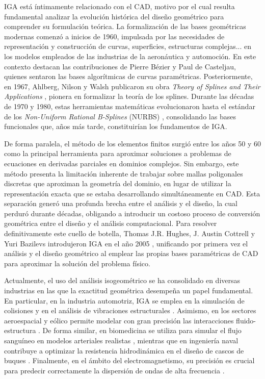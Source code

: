 \documentclass[11pt]{book}
\theoremstyle{plain} %
\theoremstyle{definition} %
\theoremstyle{definition} %
\begin{document}
IGA está íntimamente relacionado con el CAD, motivo por el cual resulta fundamental analizar la evolución histórica del diseño geométrico para comprender su formulación teórica.
La formalización de las bases geométricas modernas comenzó a inicios de 1960, impulsada por las necesidades de representación y construcción de curvas, superficies, estructuras complejas... en los modelos empleados de las industrias
de la aeronáutica y automoción. En este contexto destacan las contribuciones de Pierre Bézier y 
Paul de Casteljau, quienes sentaron las bases algorítmicas de curvas paramétricas. 
Posteriormente, en 1967, Ahlberg, Nilson y Walsh publicaron su obra 
\textit{Theory of Splines and Their Applications} \cite{ahlberg_theory_2016},
pionera en formalizar la teoría de los splines. 
Durante las décadas de 1970 y 1980, estas herramientas matemáticas evolucionaron hasta el estándar de los \textit{Non-Uniform Rational B-Splines} (NURBS) \cite{piegl_nurbs_2012}, 
consolidando las bases funcionales que, años más tarde, constituirían los fundamentos de IGA.

De forma paralela, el método de los elementos finitos surgió entre los años 50 y 60 como la principal herramienta para aproximar soluciones a problemas de ecuaciones en derivadas
parciales en dominios complejos. Sin embargo, este método presenta la limitación inherente de trabajar sobre mallas poligonales discretas que aproximan la geometría del dominio,
en lugar de utilizar la representación exacta que se estaba desarrollando simultáneamente en CAD. Esta separación generó una profunda brecha entre el análisis y el diseño, la cual perduró
durante décadas, obligando a introducir un costoso proceso de conversión geométrica entre el diseño y el análisis computacional. Para resolver definitivamente este cuello de botella,
Thomas J.R. Hughes, J. Austin Cottrell y Yuri Bazilevs introdujeron IGA en el año 2005 \cite{hughes_isogeometric_2005}, unificando por primera vez el análisis y el diseño geométrico
al emplear las propias bases paramétricas de CAD para aproximar la solución del problema físico.

Actualmente, el uso del análisis isogeométrico se ha consolidado en diversas industrias en las que la exactitud geométrica desempeña un papel fundamental. 
En particular, en la industria automotriz, IGA se emplea en la simulación de colisiones y en el análisis de vibraciones estructurales \cite{benson_large_2011, cottrell_isogeometric_2006}.
Asimismo, en los sectores aeroespacial y eólico permite modelar con gran precisión las interacciones fluido-estructura \cite{bazilevs_3d_2011}.
De forma similar, en biomedicina se utiliza para simular el flujo sanguíneo en modelos arteriales realistas \cite{bazilevs_patient-specific_2009}, mientras que en 
ingeniería naval contribuye a optimizar la resistencia hidrodinámica en el diseño de cascos de buques \cite{kostas_ship-hull_2015}. Finalmente, en el ámbito del
electromagnetismo, su precisión es crucial para predecir correctamente la dispersión de ondas de alta frecuencia \cite{buffa_isogeometric_2010}.
\end{document}
